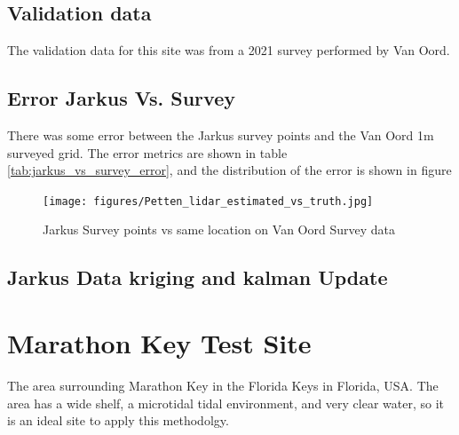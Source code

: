 \subsection{Validation data}
The validation data for this site was from a 2021 survey performed by Van Oord.
\subsection{Error Jarkus Vs. Survey}
There was some error between the Jarkus survey points and the Van Oord 1m surveyed grid. The error metrics are shown in table \ref{tab:jarkus_vs_survey_error}, and the distribution of the error is shown in figure


\begin{figure}[h]
    \centering
    \texttt{[image: figures/Petten\_lidar\_estimated\_vs\_truth.jpg]}
    \caption{Jarkus Survey points vs same location on Van Oord Survey data}
    \label{fig:jarkus_vs_survey}
\end{figure}

\subsection{Jarkus Data kriging and kalman Update}



\section{Marathon Key Test Site}
The area surrounding Marathon Key in the Florida Keys in Florida, USA. The area has a wide shelf, a microtidal tidal environment, and very clear water, so it is an ideal site to apply this methodolgy. 

